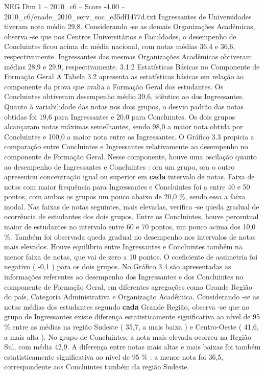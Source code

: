 \begin{textsample}{NEG Dim 1 – 2010\_c6 – Score -4.00 – 2010\_c6/enade\_2010\_serv\_soc\_e35df1477d.txt}
Ingressantes de Universidades tiveram nota média 29,8.
Considerando -se as demais Organizações Acadêmicas, observa -se que nos Centros Universitários e Faculdades, o desempenho de Concluintes ficou acima da média nacional, com notas médias 36,4 e 36,6, respectivamente.
Ingressantes das mesmas Organizações Acadêmicas obtiveram médias 28,9 e 29,9, respectivamente. 3.1.2 Estatísticas Básicas no Componente de Formação Geral A Tabela 3.2 apresenta as estatísticas básicas em relação ao componente da prova que avalia a Formação Geral dos estudantes.
Os Concluintes obtiveram desempenho médio 39,6, idêntico ao dos Ingressantes.
Quanto à variabilidade das notas nos dois grupos, o desvio padrão das notas obtidas foi 19,6 para Ingressantes e 20,0 para Concluintes.
Os dois grupos alcançaram notas máximas semelhantes, sendo 98,0 a maior nota obtida por Concluintes e 100,0 a maior nota entre os Ingressantes.
O Gráfico 3.3 propicia a comparação entre Concluintes e Ingressantes relativamente ao desempenho no componente de Formação Geral.
Nesse componente, houve uma oscilação quanto ao desempenho de Ingressantes e Concluintes : ora um grupo, ora o outro apresentou concentração igual ou superior em \textbf{cada} intervalo de notas.
Faixa de notas com maior frequência para Ingressantes e Concluintes foi a entre 40 e 50 pontos, com ambos os grupos um pouco abaixo de 20,0 \%, sendo essa a faixa modal.
Nas faixas de notas seguintes, mais elevadas, verifica -se queda gradual de ocorrência de estudantes dos dois grupos.
Entre os Concluintes, houve percentual maior de estudantes no intervalo entre 60 e 70 pontos, um pouco acima dos 10,0 \%.
Também foi observada queda gradual no desempenho nos intervalos de notas mais elevados.
Houve equilíbrio entre Ingressantes e Concluintes também na menor faixa de notas, que vai de zero a 10 pontos.
O coeficiente de assimetria foi negativo ( -0,1 ) para os dois grupos.
No Gráfico 3.4 são apresentadas as informações referentes ao desempenho dos Ingressantes e dos Concluintes no componente de Formação Geral, em diferentes agregações como Grande Região do país, Categoria Administrativa e Organização Acadêmica.
Considerando -se as notas médias dos estudantes segundo \textbf{cada} Grande Região, observa -se que no grupo de Ingressantes existe diferença estatisticamente significativa ao nível de 95 \% entre as médias na região Sudeste ( 35,7, a mais baixa ) e Centro-Oeste ( 41,6, a mais alta ).
No grupo de Concluintes, a nota mais elevada ocorreu na Região Sul, com média 42,9.
A diferença entre notas mais altas e mais baixas foi também estatisticamente significativa ao nível de 95 \% : a menor nota foi 36,5, correspondente aos Concluintes também da região Sudeste.

\end{textsample}
